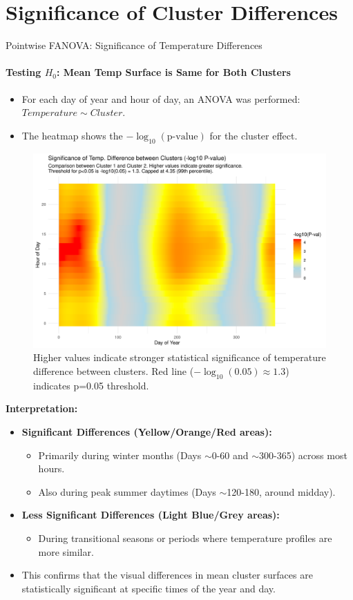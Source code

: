 \documentclass[svgnames, 12pt]{beamer}
\begin{document}
\section{Significance of Cluster Differences}
\begin{frame}{Pointwise FANOVA: Significance of Temperature Differences}
  \framesubtitle{Testing $H_0$: Mean Temp Surface is Same for Both Clusters}
  \begin{itemize}
    \item For each day of year and hour of day, an ANOVA was performed: $Temperature \sim Cluster$.
    \item The heatmap shows the $-\log_{10}(\text{p-value})$ for the cluster effect.
  \end{itemize}
  \begin{figure}
    \includegraphics[width=0.85\linewidth]{../data/output/figures/pointwise_anova_clusters_heatmap.png}
    \caption{Higher values indicate stronger statistical significance of temperature difference between clusters. Red line ($-\log_{10}(0.05) \approx 1.3$) indicates p=0.05 threshold.}
  \end{figure}
  \textbf{Interpretation:}
  \begin{itemize}
    \item \textbf{Significant Differences (Yellow/Orange/Red areas):}
        \begin{itemize}
            \item Primarily during winter months (Days $\sim$0-60 and $\sim$300-365) across most hours.
            \item Also during peak summer daytimes (Days $\sim$120-180, around midday).
        \end{itemize}
    \item \textbf{Less Significant Differences (Light Blue/Grey areas):}
        \begin{itemize}
            \item During transitional seasons or periods where temperature profiles are more similar.
        \end{itemize}
    \item This confirms that the visual differences in mean cluster surfaces are statistically significant at specific times of the year and day.
  \end{itemize}
\end{frame}
\end{document}
